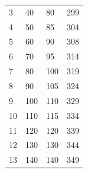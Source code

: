 \documentclass[12pt]{article}
\begin{document}
\begin{enumerate}
\begin{table}[h]
\begin{tabular}{|p{0.5cm}|p{3cm}|p{4cm}|p{4cm}|}
                3  & 40                                & 80                                               & 299                                         \\
                4  & 50                                & 85                                               & 304                                         \\
                5  & 60                                & 90                                               & 308                                         \\
                6  & 70                                & 95                                               & 314                                         \\
                7  & 80                                & 100                                              & 319                                         \\
                8  & 90                                & 105                                              & 324                                         \\
                9  & 100                               & 110                                              & 329                                         \\
                10 & 110                               & 115                                              & 334                                         \\
                11 & 120                               & 120                                              & 339                                         \\
                12 & 130                               & 130                                              & 344                                         \\
                13 & 140                               & 140                                              & 349                                         \\\hline
            \end{tabular}
        \end{table}


\end{enumerate}
\end{document}
